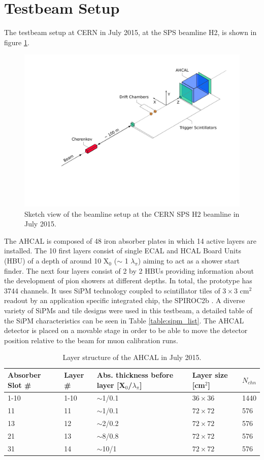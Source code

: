 \documentclass{JINST}
\begin{document}
\section{Testbeam Setup}

The testbeam setup at CERN in July 2015, at the SPS beamline H2, is shown in figure \ref{fig:TestbeamScketch}.

\begin{figure}[htbp!]
	\centering
	\includegraphics[width=0.7\linewidth]{fig/TestbeamSetup.pdf}
	\caption{Sketch view of the beamline setup at the CERN SPS H2 beamline in July 2015.} \label{fig:TestbeamScketch}
\end{figure}

The AHCAL is composed of 48 iron absorber plates in which 14 active layers are installed. The 10 first layers consist of single ECAL and HCAL Board Units (HBU) of a depth of around 10 X$_0$ ($\sim$ 1 $\lambda_{\pi}$) aiming to act as a shower start finder. The next four layers consist of 2 by 2 HBUs providing information about the development of pion showers at different depths. In total, the prototype has 3744 channels. It uses SiPM technology coupled to scintillator tiles of $3\times3$ cm$^2$ readout by an application specific integrated chip, the SPIROC2b \cite{5401891}. A diverse variety of SiPMs and tile designs were used in this testbeam, a detailed table of the SiPM characteristics can be seen in Table \ref{table:sipm_list}. The AHCAL detector is placed on a movable stage in order to be able to move the detector position relative to the beam for muon calibration runs.

\begin{table}[htb!]
	\centering
	\caption{Layer structure of the AHCAL in July 2015.}
	\label{table:muon_sel}
	\begin{tabular}{@{}lllll@{}}
		\toprule
		Absorber Slot \# & Layer \# & Abs. thickness before layer [X$_0$/$\lambda_{\pi}$] & Layer size [cm$^{2}$] & $N_{chn}$\\
		\midrule
    1-10 & 1-10 & $\sim$1/0.1 & $36\times36$ & 1440\\
    11 & 11 & $\sim$1/0.1 & $72\times72$ & 576\\
    13 & 12 & $\sim$2/0.2 & $72\times72$ & 576\\
    21 & 13 & $\sim$8/0.8 & $72\times72$ & 576\\
    31 & 14 & $\sim$10/1 & $72\times72$ & 576\\
		\bottomrule
	\end{tabular}
\end{table}
\end{document}
